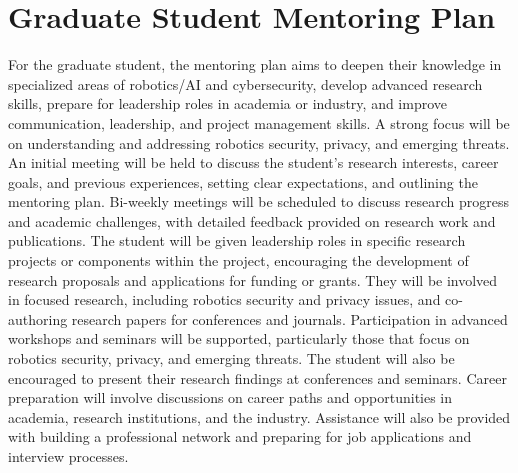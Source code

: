 \section*{Graduate Student Mentoring Plan}
For the graduate student, the mentoring plan aims to deepen their knowledge in specialized areas of robotics/AI and cybersecurity, develop advanced research skills, prepare for leadership roles in academia or industry, and improve communication, leadership, and project management skills. 
A strong focus will be on understanding and addressing robotics security, privacy, and emerging threats.
An initial meeting will be held to discuss the student's research interests, career goals, and previous experiences, setting clear expectations, and outlining the mentoring plan. 
Bi-weekly meetings will be scheduled to discuss research progress and academic challenges, with detailed feedback provided on research work and publications.
The student will be given leadership roles in specific research projects or components within the project, encouraging the development of research proposals and applications for funding or grants. They will be involved in focused research, including robotics security and privacy issues, and co-authoring research papers for conferences and journals.
Participation in advanced workshops and seminars will be supported, particularly those that focus on robotics security, privacy, and emerging threats. The student will also be encouraged to present their research findings at conferences and seminars. 
Career preparation will involve discussions on career paths and opportunities in academia, research institutions, and the industry. Assistance will also be provided with building a professional network and preparing for job applications and interview processes. 

